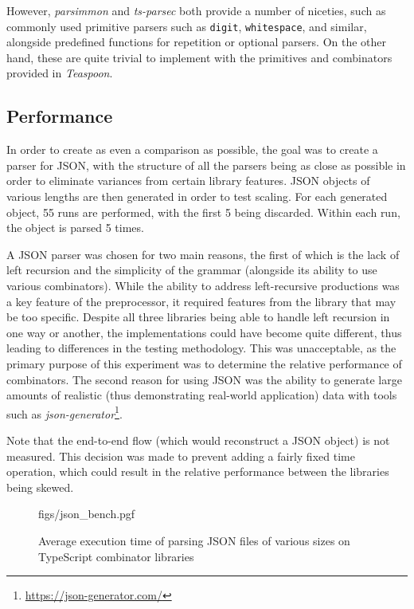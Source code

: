 However, \textit{parsimmon} and \textit{ts-parsec} both provide a number of niceties, such as commonly used primitive parsers such as \texttt{digit}, \texttt{whitespace}, and similar, alongside predefined functions for repetition or optional parsers.
On the other hand, these are quite trivial to implement with the primitives and combinators provided in \textit{Teaspoon}.

\subsection{Performance}
\label{ssec:ts_perf}

In order to create as even a comparison as possible, the goal was to create a parser for JSON, with the structure of all the parsers being as close as possible in order to eliminate variances from certain library features.
JSON objects of various lengths are then generated in order to test scaling.
For each generated object, 55 runs are performed, with the first 5 being discarded.
Within each run, the object is parsed 5 times.

A JSON parser was chosen for two main reasons, the first of which is the lack of left recursion and the simplicity of the grammar (alongside its ability to use various combinators).
While the ability to address left-recursive productions was a key feature of the preprocessor, it required features from the library that may be too specific.
Despite all three libraries being able to handle left recursion in one way or another, the implementations could have become quite different, thus leading to differences in the testing methodology.
This was unacceptable, as the primary purpose of this experiment was to determine the relative performance of combinators.
The second reason for using JSON was the ability to generate large amounts of realistic (thus demonstrating real-world application) data with tools such as \textit{json-generator}\footnote{\url{https://json-generator.com/}}.

Note that the end-to-end flow (which would reconstruct a JSON object) is not measured.
This decision was made to prevent adding a fairly fixed time operation, which could result in the relative performance between the libraries being skewed.

\begin{figure}[H]
    \centering
    {figs/json_bench.pgf}
    \vspace{-0.5\baselineskip}
    \caption{Average execution time of parsing JSON files of various sizes on TypeScript combinator libraries}
    \label{fig:ts_compare_json}
\end{figure}

